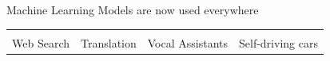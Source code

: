 \begin{frame}{Machine Learning Models are now used everywhere}
\begin{table}
{\begin{tabular}{
	cccc
      }
\begin{minipage}{0.22\textwidth}
	\end{minipage} \\[0.5cm]
	Web Search & Translation & Vocal Assistants & Self-driving cars
      \end{tabular}
    }
  \end{table}

  \vspace{0.4cm}


\end{frame}



%
